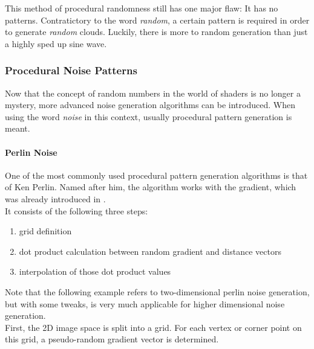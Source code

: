 \noindent
This method of procedural randomness still has one major flaw: It has no patterns. Contratictory to the word \textit{random}, a certain pattern is required in order to generate \textit{random} clouds. Luckily, there is more to random generation than just a highly sped up sine wave.

\clearpage
\subsubsection{Procedural Noise Patterns}
Now that the concept of random numbers in the world of shaders is no longer a mystery, more advanced noise generation algorithms can be introduced.
When using the word \textit{\gls{noise}} in this context, usually procedural pattern generation is meant.

\paragraph{Perlin Noise}
One of the most commonly used procedural pattern generation algorithms is that of Ken Perlin. Named after him, the algorithm works with the gradient, which was already introduced in .
\\
It consists of the following three steps: 
\begin{enumerate}
    \item grid definition
    \item dot product calculation between random gradient and distance vectors
    \item interpolation of those dot product values
\end{enumerate}

\noindent
Note that the following example refers to two-dimensional perlin noise generation, but with some tweaks, is very much applicable for higher dimensional noise generation.
\\
First, the 2D image space is split into a grid. For each vertex or corner point on this grid, a pseudo-random gradient vector is determined.

